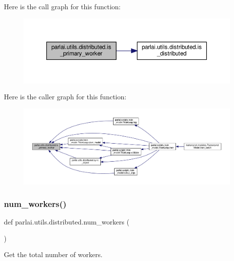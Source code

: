Here is the call graph for this function\+:
\nopagebreak
\begin{figure}[H]
\begin{center}
\leavevmode
\includegraphics[width=350pt]{namespaceparlai_1_1utils_1_1distributed_a9bb1dac198180590ef8c6b6c6f9fc2c4_cgraph}
\end{center}
\end{figure}
Here is the caller graph for this function\+:
\nopagebreak
\begin{figure}[H]
\begin{center}
\leavevmode
\includegraphics[width=350pt]{namespaceparlai_1_1utils_1_1distributed_a9bb1dac198180590ef8c6b6c6f9fc2c4_icgraph}
\end{center}
\end{figure}
\mbox{\label{namespaceparlai_1_1utils_1_1distributed_a99b61b4756577c6542039c238d670dba}} 
\subsubsection{\texorpdfstring{num\+\_\+workers()}{num\_workers()}}
{\footnotesize\ttfamily def parlai.\+utils.\+distributed.\+num\+\_\+workers (\begin{DoxyParamCaption}{ }\end{DoxyParamCaption})}

\begin{DoxyVerb}Get the total number of workers.\end{DoxyVerb}
 

